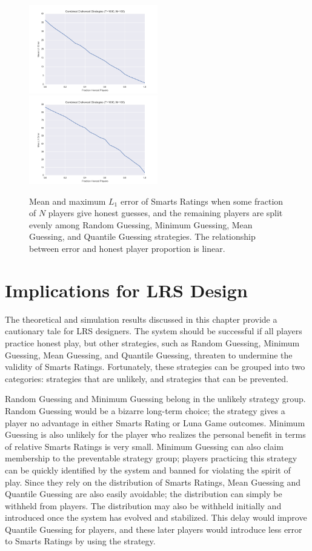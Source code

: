 \begin{figure}[h]
\centerline{%
\includegraphics[width=0.5\textwidth]{figures/robustness/Combined_Dishonest_Strategies31.png}
\includegraphics[width=0.5\textwidth] {figures/robustness/Combined_Dishonest_Strategies32.png}%
}%
\caption{Mean and maximum $L_1$ error of Smarts Ratings when some fraction of $N$ players give honest guesses, and the remaining players are split evenly among Random Guessing, Minimum Guessing, Mean Guessing, and Quantile Guessing strategies. The relationship between error and honest player proportion is linear.}
\label{fig:Combined}
\end{figure}
\section{Implications for LRS Design}

The theoretical and simulation results discussed in this chapter provide a cautionary tale for LRS designers. The system should be successful if all players practice honest play, but other strategies, such as Random Guessing, Minimum Guessing, Mean Guessing, and Quantile Guessing, threaten to undermine the validity of Smarts Ratings. Fortunately, these strategies can be grouped into two categories: strategies that are unlikely, and strategies that can be prevented. 

Random Guessing and Minimum Guessing belong in the unlikely strategy group. Random Guessing would be a bizarre long-term choice; the strategy gives a player no advantage in either Smarts Rating or Luna Game outcomes. Minimum Guessing is also unlikely for the player who realizes the personal benefit in terms of relative Smarts Ratings is very small. Minimum Guessing can also claim membership to the preventable strategy group; players practicing this strategy can be quickly identified by the system and banned for violating the spirit of play. Since they rely on the distribution of Smarts Ratings, Mean Guessing and Quantile Guessing are also easily avoidable; the distribution can simply be withheld from players. The distribution may also be withheld initially and introduced once the system has evolved and stabilized. This delay would improve Quantile Guessing for players, and these later players would introduce less error to Smarts Ratings by using the strategy.

